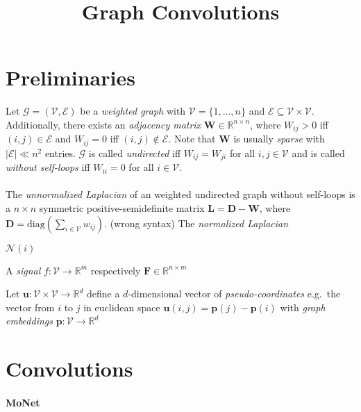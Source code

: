 \documentclass[pdftex,10pt,a4paper]{scrartcl}
\title{Graph Convolutions}
\date{\vspace{-5ex}}
\begin{document}
\maketitle

\section{Preliminaries}

Let $\mathcal{G} = (\mathcal{V}, \mathcal{E})$ be a \emph{weighted graph} with $\mathcal{V} = \{1, \ldots, n\}$ and $\mathcal{E} \subseteq \mathcal{V} \times \mathcal{V}$.
Additionally, there exists an \emph{adjacency matrix} $\mathbf{W} \in \mathbb{R}^{n \times n}$, where $W_{ij} > 0$ iff $(i, j) \in \mathcal{E}$ and $W_{ij} = 0$ iff $(i, j) \not\in \mathcal{E}$.
Note that $\mathbf{W}$ is usually \emph{sparse} with $|\mathcal{E}| \ll n^2$ entries.
$\mathcal{G}$ is called \emph{undirected} iff $W_{ij} = W_{ji}$ for all $i,j \in \mathcal{V}$ and is called \emph{without self-loops} iff $W_{ii} = 0$ for all $i \in \mathcal{V}$.
\\\\

The \emph{unnormalized Laplacian} of an weighted undirected graph without self-loops is a $n \times n$ symmetric positive-semidefinite matrix $\mathbf{L} = \mathbf{D} - \mathbf{W}$, where $\mathbf{D} = \mathrm{diag}\left( \sum_{i \in \mathcal{V}} w_{ij}\right)$. (wrong syntax)
The \emph{normalized Laplacian}

$\mathcal{N}(i)$

A \emph{signal} $f \colon \mathcal{V} \to \mathbb{R}^m$ respectively $\mathbf{F} \in \mathbb{R}^{n \times m}$

Let $\mathbf{u} \colon \mathcal{V} \times \mathcal{V} \to \mathbb{R}^d$ define a $d$-dimensional vector of \emph{pseudo-coordinates}
e.g.\ the vector from $i$ to $j$ in euclidean space $\mathbf{u}(i,j) = \mathbf{p}(j) - \mathbf{p}(i)$ with \emph{graph embeddings} $\mathbf{p} \colon \mathcal{V} \to \mathbb{R}^d$
\cite{Bronstein2017}

\section{Convolutions}

\paragraph{MoNet}
\end{document}
